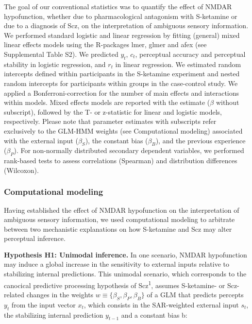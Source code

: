 \documentclass[
]{article}
\begin{document}
The goal of our conventional statistics was to quantify the effect of
NMDAR hypofunction, whether due to pharmacological antagonism with
S-ketamine or due to a diagnosis of Scz, on the interpretation of
ambiguous sensory information. We performed standard logistic and linear
regression by fitting (general) mixed linear effects models using the
R-packages lmer, glmer and afex (see Supplemental Table S2). We
predicted \(y_t\), \(c_t\), perceptual accuracy and perceptual stability
in logistic regression, and \(r_t\) in linear regression. We estimated
random intercepts defined within participants in the S-ketamine
experiment and nested random intercepts for participants within groups
in the case-control study. We applied a Bonferroni-correction for the
number of main effects and interactions within models. Mixed effects
models are reported with the estimate (\(\beta\) without subscript),
followed by the T- or z-statistic for linear and logistic models,
respectively. Please note that parameter estimates with subscripts refer
exclusively to the GLM-HMM weights (see Computational modeling)
associated with the external input (\(\beta_S\)), the constant bias
(\(\beta_B\)), and the previous experience (\(\beta_P\)). For
non-normally distributed secondary dependent variables, we performed
rank-based tests to assess correlations (Spearman) and distribution
differences (Wilcoxon).

\subsubsection{Computational modeling}\label{computational-modeling}

Having established the effect of NMDAR hypofunction on the
interpretation of ambiguous sensory information, we used computational
modeling to arbitrate between two mechanistic explanations on how
S-ketamine and Scz may alter perceptual inference.

\textbf{Hypothesis H1: Unimodal inference.} In one scenario, NMDAR
hypofunction may induce a global increase in the sensitivity to external
inputs relative to stabilizing internal predictions. This unimodal
scenario, which corresponds to the canocical predictive processing
hypothesis of Scz\textsuperscript{1}, assumes S-ketamine- or Scz-related
changes in the weights \(w \equiv \{\beta_S, \beta_P, \beta_B\}\) of a
GLM that predicts percepts \(y_t\) from the input vector \(x_t\), which
consists in the SAR-weighted external input \(s_t\), the stabilizing
internal prediction \(y_{t-1}\) and a constant bias b:
\end{document}
